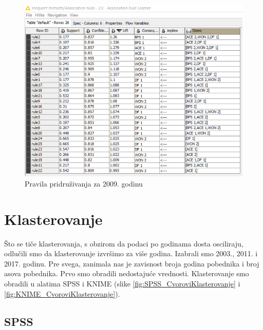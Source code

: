 \documentclass[a4paper]{article}
\begin{document}
\begin{figure}[H]
	\begin{center}
		\includegraphics[width=1\textwidth]{PravilaPridruzivanja/rule_learner_2009}
	\end{center}
	\caption{Pravila pridruživanja za 2009. godinu}
	\label{fig:rule_learner}
\end{figure}

\section{Klasterovanje}

Što se tiče klasterovanja, s obzirom da podaci po godinama dosta osciliraju, odlučili smo da klasterovanje izvršimo za više godina. Izabrali smo 2003., 2011. i 2017. godinu. Pre svega, zanimala nas je zavisnost broja godina pobednika i broj asova pobednika. Prvo smo obradili nedostajuće vrednosti. Klasterovanje smo obradili u alatima SPSS i KNIME (slike \ref{fig:SPSS_CvoroviKlasterovanje} i \ref{fig:KNIME_CvoroviKlasterovanje}). 

\subsection{SPSS}
\end{document}
